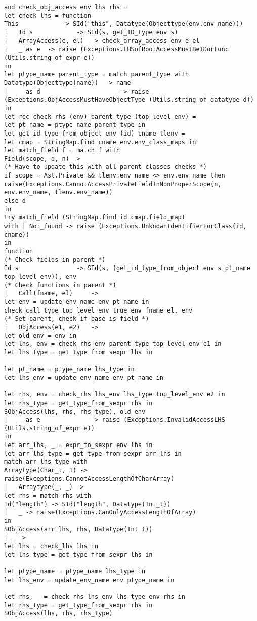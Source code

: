 \begin{verbatim}
and check_obj_access env lhs rhs = 
let check_lhs = function
This 			-> SId("this", Datatype(Objecttype(env.env_name)))
|	Id s 			-> SId(s, get_ID_type env s)
| 	ArrayAccess(e, el)	-> check_array_access env e el
| 	_ as e 	-> raise (Exceptions.LHSofRootAccessMustBeIDorFunc (Utils.string_of_expr e))
in
let ptype_name parent_type = match parent_type with
Datatype(Objecttype(name)) 	-> name
| 	_ as d						-> raise (Exceptions.ObjAccessMustHaveObjectType (Utils.string_of_datatype d))
in
let rec check_rhs (env) parent_type (top_level_env) = 
let pt_name = ptype_name parent_type in
let get_id_type_from_object env (id) cname tlenv = 
let cmap = StringMap.find cname env.env_class_maps in
let match_field f = match f with
Field(scope, d, n) -> 
(* Have to update this with all parent classes checks *)
if scope = Ast.Private && tlenv.env_name <> env.env_name then
raise(Exceptions.CannotAccessPrivateFieldInNonProperScope(n, env.env_name, tlenv.env_name))
else d
in	
try match_field (StringMap.find id cmap.field_map)
with | Not_found -> raise (Exceptions.UnknownIdentifierForClass(id, cname))
in
function
(* Check fields in parent *)
Id s 				-> SId(s, (get_id_type_from_object env s pt_name top_level_env)), env
(* Check functions in parent *)
| 	Call(fname, el) 	-> 
let env = update_env_name env pt_name in
check_call_type top_level_env true env fname el, env
(* Set parent, check if base is field *)
| 	ObjAccess(e1, e2) 	-> 
let old_env = env in
let lhs, env = check_rhs env parent_type top_level_env e1 in
let lhs_type = get_type_from_sexpr lhs in

let pt_name = ptype_name lhs_type in
let lhs_env = update_env_name env pt_name in

let rhs, env = check_rhs lhs_env lhs_type top_level_env e2 in
let rhs_type = get_type_from_sexpr rhs in
SObjAccess(lhs, rhs, rhs_type), old_env
| 	_ as e				-> raise (Exceptions.InvalidAccessLHS (Utils.string_of_expr e))
in 
let arr_lhs, _ = expr_to_sexpr env lhs in
let arr_lhs_type = get_type_from_sexpr arr_lhs in
match arr_lhs_type with
Arraytype(Char_t, 1) -> raise(Exceptions.CannotAccessLengthOfCharArray)
|	Arraytype(_, _) -> 
let rhs = match rhs with
Id("length") -> SId("length", Datatype(Int_t))
| 	_ -> raise(Exceptions.CanOnlyAccessLengthOfArray)
in
SObjAccess(arr_lhs, rhs, Datatype(Int_t))
| _ ->
let lhs = check_lhs lhs in
let lhs_type = get_type_from_sexpr lhs in 

let ptype_name = ptype_name lhs_type in
let lhs_env = update_env_name env ptype_name in

let rhs, _ = check_rhs lhs_env lhs_type env rhs in
let rhs_type = get_type_from_sexpr rhs in
SObjAccess(lhs, rhs, rhs_type)


\end{verbatim}
